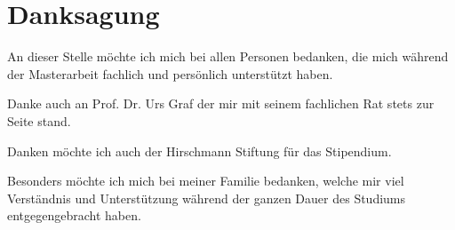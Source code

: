 \chapter{Danksagung}




An dieser Stelle möchte ich mich bei allen Personen bedanken, die mich während der Masterarbeit fachlich und persönlich unterstützt haben.

Danke auch an Prof. Dr. Urs Graf der mir mit seinem fachlichen Rat stets zur Seite stand.

Danken möchte ich auch der Hirschmann Stiftung für das Stipendium.


Besonders möchte ich mich bei meiner Familie bedanken, welche mir viel Verständnis und Unterstützung während der ganzen Dauer des Studiums entgegengebracht haben.